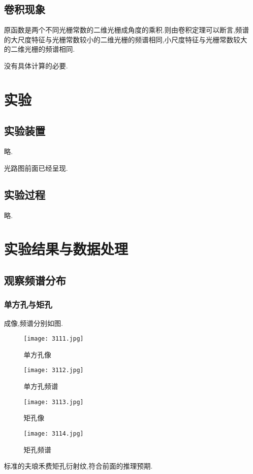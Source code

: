 \documentclass[10pt]{ctexart}
\begin{document}
\subsection{卷积现象}
原函数是两个不同光栅常数的二维光栅成角度的乘积.则由卷积定理可以断言,频谱的大尺度特征与光栅常数较小的二维光栅的频谱相同,小尺度特征与光栅常数较大的二维光栅的频谱相同.

没有具体计算的必要.
\section{实验}
\subsection{实验装置}
略.

光路图前面已经呈现.
\subsection{实验过程}
略.
\section{实验结果与数据处理}
\subsection{观察频谱分布}
\subsubsection{单方孔与矩孔}
成像,频谱分别如图.
\begin{figure}[H]
\begin{minipage}[t]{0.5\linewidth}
\centering
\texttt{[image: 3111.jpg]}
\caption{单方孔像} 
\end{minipage}
\hfill
\begin{minipage}[t]{0.5\linewidth}
\centering
\texttt{[image: 3112.jpg]}
\caption{单方孔频谱}
\end{minipage}
\end{figure}
\begin{figure}[H]
\begin{minipage}[t]{0.5\linewidth}
\centering
\texttt{[image: 3113.jpg]}
\caption{矩孔像} 
\end{minipage}
\hfill
\begin{minipage}[t]{0.5\linewidth}
\centering
\texttt{[image: 3114.jpg]}
\caption{矩孔频谱}
\end{minipage}
\end{figure}
标准的夫琅禾费矩孔衍射纹,符合前面的推理预期.
\end{document}
